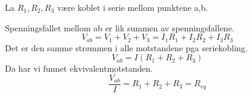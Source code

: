 La $R_1, R_2, R_3$ være koblet i serie mellom punktene a,b.

Spenningsfallet mellom ab er lik summen av spenningsfallene.
$$V_{ab} = V_1 + V_2 + V_3
         = I_1R_1 + I_2R_2 + I_3R_3$$
Det er den samme strømmen i alle motstandene pga seriekobling.
$$V_{ab} = I(R_1 + R_2 + R_3)$$
Da har vi funnet ekvivalentmotstanden.
$$\frac{V_{ab}}{I} = R_1 + R_2 + R_3 = R_{eq}$$
